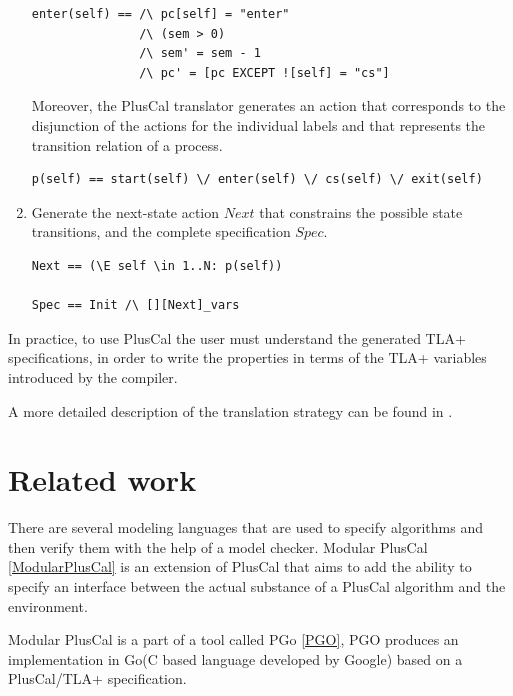 \documentclass{thesul}
\begin{document}
\begin{enumerate}
\begin{lstlisting}[frame = tlrb, firstnumber = 1, xleftmargin=.2\textwidth, xrightmargin=.2\textwidth]
enter(self) == /\ pc[self] = "enter"
               /\ (sem > 0)
               /\ sem' = sem - 1
               /\ pc' = [pc EXCEPT ![self] = "cs"]
\end{lstlisting}

Moreover, the PlusCal translator generates an action that corresponds to the disjunction of the actions for the individual labels and that represents the transition relation of a process.

\begin{lstlisting}[frame = tlrb, firstnumber = 1, xleftmargin=.05\textwidth, xrightmargin=.05\textwidth]
p(self) == start(self) \/ enter(self) \/ cs(self) \/ exit(self)
\end{lstlisting}

\item Generate the next-state action $Next$ that constrains the possible state transitions, and the complete specification $Spec$.

\begin{lstlisting}[frame = tlrb, firstnumber = 1, xleftmargin=.2\textwidth, xrightmargin=.2\textwidth]
Next == (\E self \in 1..N: p(self))

Spec == Init /\ [][Next]_vars

\end{lstlisting}

\end{enumerate}


In practice, to use PlusCal the user must understand the generated TLA+ specifications, in order to write the properties in terms of the TLA+ variables introduced by the compiler.

A more detailed description of the translation strategy can be found in \cite{pcalAlgo}.

\chapter{Related work}

There are several modeling languages that are used to specify algorithms and then verify them with the help of a model checker. Modular PlusCal \ref{ModularPlusCal} is an extension of PlusCal that aims to add the ability to specify an interface between the actual substance of a PlusCal algorithm and the environment.

Modular PlusCal is a part of a tool called PGo \ref{PGO}, PGO produces an implementation in Go(C based language developed by Google) based on a PlusCal/TLA+ specification.
\end{document}
